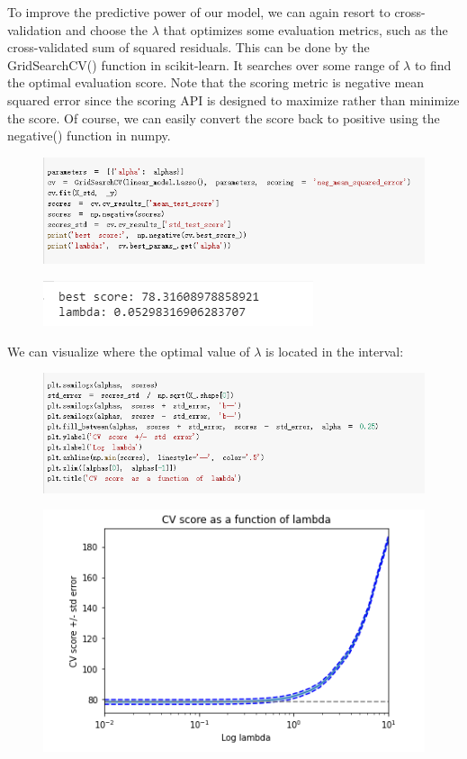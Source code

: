 \documentclass{article}
\begin{document}
To improve the predictive power of our model, we can again resort to cross-validation and choose the $\lambda$ that optimizes some evaluation metrics, such as the cross-validated sum of squared residuals. This can be done by the GridSearchCV() function in scikit-learn. It searches over some range of $\lambda$ to find the optimal evaluation score. Note that the scoring metric is negative mean squared error since the scoring API is designed to maximize rather than minimize the score. Of course, we can easily convert the score back to positive using the negative() function in numpy.
\begin{figure}[H]\centering\includegraphics[width=\linewidth]{36}\end{figure}
\begin{figure}[H]\includegraphics[width=0.5\linewidth]{37}\end{figure}
We can visualize where the optimal value of $\lambda$ is located in the interval:
\begin{figure}[H]\includegraphics[width=\linewidth]{38}\end{figure}
\begin{figure}[H]\centering\includegraphics[width=0.6\linewidth]{39}\end{figure}
\end{document}

